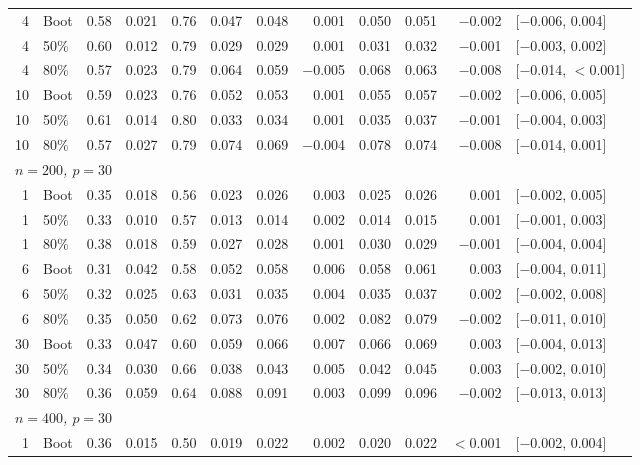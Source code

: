 \documentclass[11pt]{article}
\theoremstyle{plain}
\theoremstyle{definition}
\theoremstyle{remark}
\begin{document}
\begin{table}[htbp!]
\begin{tabular}{rlrrrrrrrrrl}
		4  & Boot & 0.58 & 0.021 & 0.76 & 0.047 & 0.048 & 0.001     & 0.050 & 0.051 & $-$0.002 & [$-$0.006, 0.004] \\
		4  & 50\% & 0.60 & 0.012 & 0.79 & 0.029 & 0.029 & 0.001     & 0.031 & 0.032 & $-$0.001 & [$-$0.003, 0.002] \\
		4  & 80\% & 0.57 & 0.023 & 0.79 & 0.064 & 0.059 & $-$0.005  & 0.068 & 0.063 & $-$0.008 & [$-$0.014, $<$0.001] \\
		10 & Boot & 0.59 & 0.023 & 0.76 & 0.052 & 0.053 & 0.001     & 0.055 & 0.057 & $-$0.002 & [$-$0.006, 0.005] \\
		10 & 50\% & 0.61 & 0.014 & 0.80 & 0.033 & 0.034 & 0.001     & 0.035 & 0.037 & $-$0.001 & [$-$0.004, 0.003] \\
		10 & 80\% & 0.57 & 0.027 & 0.79 & 0.074 & 0.069 & $-$0.004  & 0.078 & 0.074 & $-$0.008 & [$-$0.014, 0.001] \\[4pt]
		\multicolumn{12}{l}{\textit{$n = 200$, $p = 30$}} \\[2pt]
		1  & Boot & 0.35 & 0.018 & 0.56 & 0.023 & 0.026 & 0.003     & 0.025 & 0.026 & 0.001 & [$-$0.002, 0.005] \\
		1  & 50\% & 0.33 & 0.010 & 0.57 & 0.013 & 0.014 & 0.002     & 0.014 & 0.015 & 0.001 & [$-$0.001, 0.003] \\
		1  & 80\% & 0.38 & 0.018 & 0.59 & 0.027 & 0.028 & 0.001     & 0.030 & 0.029 & $-$0.001 & [$-$0.004, 0.004] \\
		6  & Boot & 0.31 & 0.042 & 0.58 & 0.052 & 0.058 & 0.006     & 0.058 & 0.061 & 0.003 & [$-$0.004, 0.011] \\
		6  & 50\% & 0.32 & 0.025 & 0.63 & 0.031 & 0.035 & 0.004     & 0.035 & 0.037 & 0.002 & [$-$0.002, 0.008] \\
		6  & 80\% & 0.35 & 0.050 & 0.62 & 0.073 & 0.076 & 0.002     & 0.082 & 0.079 & $-$0.002 & [$-$0.011, 0.010] \\
		30 & Boot & 0.33 & 0.047 & 0.60 & 0.059 & 0.066 & 0.007     & 0.066 & 0.069 & 0.003 & [$-$0.004, 0.013] \\
		30 & 50\% & 0.34 & 0.030 & 0.66 & 0.038 & 0.043 & 0.005     & 0.042 & 0.045 & 0.003 & [$-$0.002, 0.010] \\
		30 & 80\% & 0.36 & 0.059 & 0.64 & 0.088 & 0.091 & 0.003     & 0.099 & 0.096 & $-$0.002 & [$-$0.013, 0.013] \\[4pt]
		\multicolumn{12}{l}{\textit{$n = 400$, $p = 30$}} \\[2pt]
		1  & Boot & 0.36 & 0.015 & 0.50 & 0.019 & 0.022 & 0.002     & 0.020 & 0.022 & $<$0.001 & [$-$0.002, 0.004] \\

\end{tabular}
\end{table}
\end{document}
